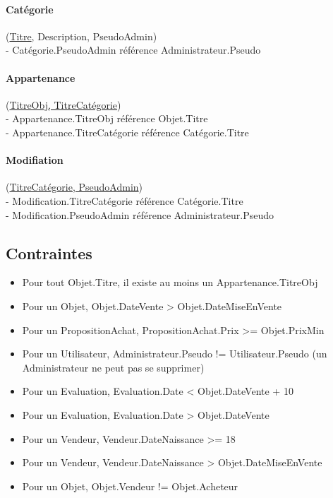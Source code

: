 \documentclass[a4paper,11pt]{article}
\begin{document}
\paragraph{Catégorie} (\underline{Titre}, Description, PseudoAdmin)\\
\indent - Catégorie.PseudoAdmin référence Administrateur.Pseudo


\paragraph{Appartenance} (\underline{TitreObj, TitreCatégorie})\\
\indent - Appartenance.TitreObj référence Objet.Titre\\
\indent - Appartenance.TitreCatégorie référence Catégorie.Titre


\paragraph{Modifiation} (\underline{TitreCatégorie, PseudoAdmin})\\
\indent - Modification.TitreCatégorie référence Catégorie.Titre\\
\indent - Modification.PseudoAdmin référence Administrateur.Pseudo


\subsection{Contraintes}

\begin{itemize}
\item Pour tout Objet.Titre, il existe au moins un Appartenance.TitreObj
\item Pour un Objet, Objet.DateVente > Objet.DateMiseEnVente
\item Pour un PropositionAchat, PropositionAchat.Prix >= Objet.PrixMin
\item Pour un Utilisateur, Administrateur.Pseudo != Utilisateur.Pseudo (un Administrateur ne peut pas se supprimer)
\item Pour un Evaluation, Evaluation.Date < Objet.DateVente + 10
\item Pour un Evaluation, Evaluation.Date > Objet.DateVente
\item Pour un Vendeur, Vendeur.DateNaissance >= 18
\item Pour un Vendeur, Vendeur.DateNaissance > Objet.DateMiseEnVente
\item Pour un Objet, Objet.Vendeur != Objet.Acheteur
\end{itemize}
\end{document}

